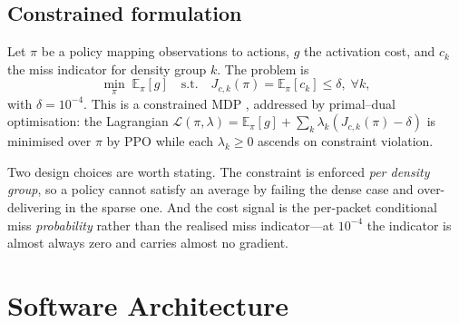 \documentclass[conference]{IEEEtran}
\begin{document}
\subsection{Constrained formulation}

Let $\pi$ be a policy mapping observations to actions, $g$ the activation
cost, and $c_k$ the miss indicator for density group $k$. The problem is
\begin{equation}
\min_{\pi}\;\mathbb{E}_{\pi}\!\left[g\right]
\quad\text{s.t.}\quad
J_{c,k}(\pi) = \mathbb{E}_{\pi}\!\left[c_k\right] \le \delta,\;
\forall k,
\label{eq:cmdp}
\end{equation}
with $\delta=10^{-4}$. This is a constrained MDP \cite{altman1999}, addressed
by primal--dual optimisation: the Lagrangian
$\mathcal{L}(\pi,\lambda)=\mathbb{E}_\pi[g]+\sum_k\lambda_k
(J_{c,k}(\pi)-\delta)$ is minimised over $\pi$ by PPO \cite{schulman2017}
while each $\lambda_k\ge 0$ ascends on constraint violation.

Two design choices are worth stating. The constraint is enforced \emph{per
density group}, so a policy cannot satisfy an average by failing the dense
case and over-delivering in the sparse one. And the cost signal is the
per-packet conditional miss \emph{probability} rather than the realised miss
indicator---at $10^{-4}$ the indicator is almost always zero and carries
almost no gradient.

\section{Software Architecture}
\label{sec:arch}
\end{document}
